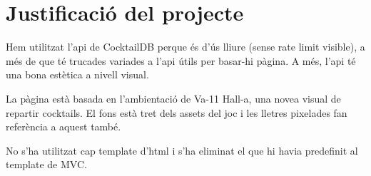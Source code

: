 \section{Justificaci\'o del projecte}
Hem utilitzat l'api de CocktailDB perque \'es d'\'us lliure (sense rate limit visible),
a m\'es de que t\'e trucades variades a l'api \'utils per basar-hi p\`agina.
A m\'es, l'api t\'e una bona est\`etica a nivell visual.

La p\`agina est\`a basada en l'ambientaci\'o de Va-11 Hall-a,
una nove\lgem a visual de repartir cocktails.
El fons est\`a tret dels assets del joc
i les lletres pixelades fan refer\`encia a aquest tamb\'e.

No s'ha utilitzat cap template d'html
i s'ha eliminat el que hi havia predefinit al template de MVC.
